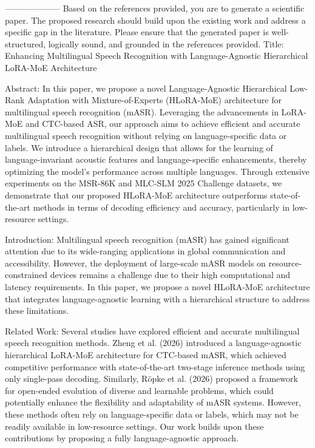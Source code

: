         --------------------
         Based on the references provided, you are to generate a scientific paper. The proposed research should build upon the existing work and address a specific gap in the literature. Please ensure that the generated paper is well-structured, logically sound, and grounded in the references provided.
Title: Enhancing Multilingual Speech Recognition with Language-Agnostic Hierarchical LoRA-MoE Architecture

Abstract:
In this paper, we propose a novel Language-Agnostic Hierarchical Low-Rank Adaptation with Mixture-of-Experts (HLoRA-MoE) architecture for multilingual speech recognition (mASR). Leveraging the advancements in LoRA-MoE and CTC-based ASR, our approach aims to achieve efficient and accurate multilingual speech recognition without relying on language-specific data or labels. We introduce a hierarchical design that allows for the learning of language-invariant acoustic features and language-specific enhancements, thereby optimizing the model's performance across multiple languages. Through extensive experiments on the MSR-86K and MLC-SLM 2025 Challenge datasets, we demonstrate that our proposed HLoRA-MoE architecture outperforms state-of-the-art methods in terms of decoding efficiency and accuracy, particularly in low-resource settings.

Introduction:
Multilingual speech recognition (mASR) has gained significant attention due to its wide-ranging applications in global communication and accessibility. However, the deployment of large-scale mASR models on resource-constrained devices remains a challenge due to their high computational and latency requirements. In this paper, we propose a novel HLoRA-MoE architecture that integrates language-agnostic learning with a hierarchical structure to address these limitations.

Related Work:
Several studies have explored efficient and accurate multilingual speech recognition methods. Zheng et al. (2026) introduced a language-agnostic hierarchical LoRA-MoE architecture for CTC-based mASR, which achieved competitive performance with state-of-the-art two-stage inference methods using only single-pass decoding. Similarly, Röpke et al. (2026) proposed a framework for open-ended evolution of diverse and learnable problems, which could potentially enhance the flexibility and adaptability of mASR systems. However, these methods often rely on language-specific data or labels, which may not be readily available in low-resource settings. Our work builds upon these contributions by proposing a fully language-agnostic approach.

